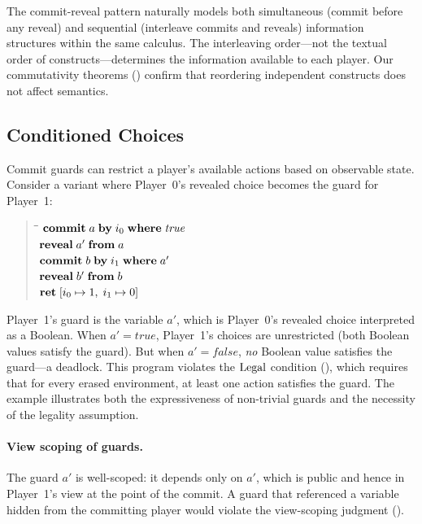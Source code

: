 \documentclass[11pt]{article}
\begin{document}
The commit-reveal pattern naturally models both simultaneous (commit before any
reveal) and sequential (interleave commits and reveals) information structures
within the same calculus. The interleaving order---not the textual order of
constructs---determines the information available to each player. Our
commutativity theorems () confirm that reordering
independent constructs does not affect semantics.

\subsection{Conditioned Choices}\label{sec:conditioned}

Commit guards can restrict a player's available actions based on observable
state. Consider a variant where Player~0's revealed choice becomes the guard
for Player~1:
%
\begin{quote}
\begin{tabbing}
\qquad\= \qquad\= \kill
$\mathbf{commit}\;a\;\mathbf{by}\;i_{0}\;\mathbf{where}\;\mathit{true}$ \\
$\mathbf{reveal}\;a'\;\mathbf{from}\;a$ \\
$\mathbf{commit}\;b\;\mathbf{by}\;i_{1}\;\mathbf{where}\;a'$ \\
$\mathbf{reveal}\;b'\;\mathbf{from}\;b$ \\
$\mathbf{ret}\;[i_{0} \mapsto 1,\; i_{1} \mapsto 0]$
\end{tabbing}
\end{quote}
%
Player~1's guard is the variable $a'$, which is Player~0's revealed choice
interpreted as a Boolean. When $a' = \mathit{true}$, Player~1's choices are
unrestricted (both Boolean values satisfy the guard). But when
$a' = \mathit{false}$, \emph{no} Boolean value satisfies the guard---a
deadlock. This program violates the $\mathrm{Legal}$ condition
(), which requires that for every erased environment, at
least one action satisfies the guard. The example illustrates both the
expressiveness of non-trivial guards and the necessity of the legality
assumption.

\paragraph{View scoping of guards.}
The guard $a'$ is well-scoped: it depends only on $a'$, which is public
and hence in Player~1's view at the point of the commit. A guard that
referenced a variable hidden from the committing player would violate the
view-scoping judgment ().
\end{document}

